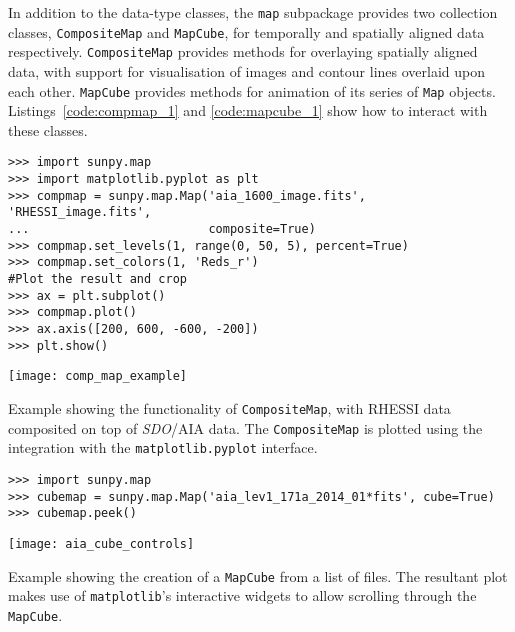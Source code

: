 In addition to the data-type classes, the \texttt{map} subpackage provides two 
collection classes, \texttt{CompositeMap} and \texttt{MapCube}, for 
temporally and spatially aligned data respectively.
\texttt{CompositeMap} provides methods for overlaying spatially aligned 
data, with support for visualisation of images and contour lines overlaid 
upon each other.
\texttt{MapCube} provides methods for animation of its series of \texttt{Map} 
objects. Listings~\ref{code:compmap_1} and \ref{code:mapcube_1} show how to 
interact with these classes.

\begin{listing}[H]
\begin{verbatim}
>>> import sunpy.map
>>> import matplotlib.pyplot as plt
>>> compmap = sunpy.map.Map('aia_1600_image.fits', 'RHESSI_image.fits', 
...                         composite=True)
>>> compmap.set_levels(1, range(0, 50, 5), percent=True)
>>> compmap.set_colors(1, 'Reds_r')
#Plot the result and crop
>>> ax = plt.subplot()
>>> compmap.plot()
>>> ax.axis([200, 600, -600, -200])
>>> plt.show()
\end{verbatim}
\begin{center}
\texttt{[image: comp\_map\_example]}
\end{center}
\caption{Example showing the functionality of \texttt{CompositeMap}, with RHESSI data composited
on top of \textit{SDO}/AIA data. The \texttt{CompositeMap} is plotted using the integration with the \texttt{matplotlib.pyplot} interface.}
\label{code:compmap_1}
\end{listing}

\begin{listing}[H]
\begin{verbatim}
>>> import sunpy.map
>>> cubemap = sunpy.map.Map('aia_lev1_171a_2014_01*fits', cube=True)
>>> cubemap.peek()
\end{verbatim}
\begin{center}
\texttt{[image: aia\_cube\_controls]}
\end{center}
\caption{Example showing the creation of a \texttt{MapCube} from a list of files. The 
resultant plot makes use of \texttt{matplotlib}'s interactive widgets to allow scrolling 
through the \texttt{MapCube}.}
\label{code:mapcube_1}
\end{listing}